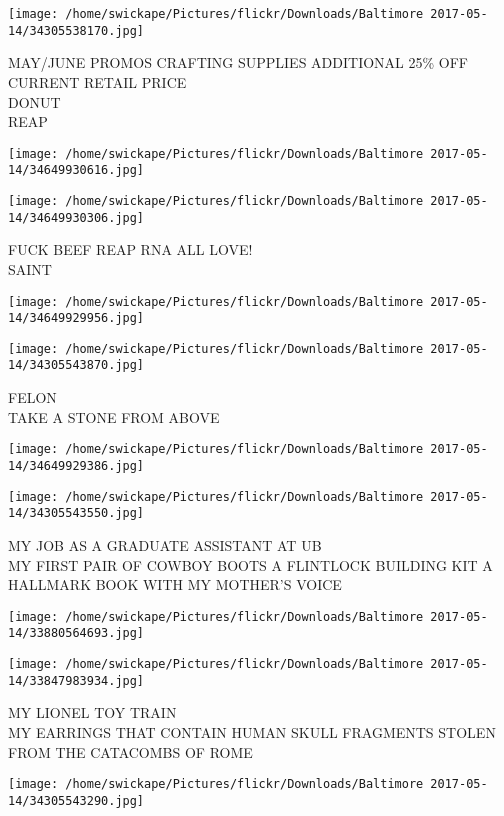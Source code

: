 \documentclass[10pt,letterpaper]{article}
\begin{document}
\vspace{0.25in}
\texttt{[image: /home/swickape/Pictures/flickr/Downloads/Baltimore 2017-05-14/34305538170.jpg]}

MAY/JUNE PROMOS CRAFTING SUPPLIES ADDITIONAL 25\% OFF CURRENT RETAIL PRICE\\
DONUT\\
REAP
\pagebreak

\texttt{[image: /home/swickape/Pictures/flickr/Downloads/Baltimore 2017-05-14/34649930616.jpg]}

\vspace{0.25in}
\texttt{[image: /home/swickape/Pictures/flickr/Downloads/Baltimore 2017-05-14/34649930306.jpg]}

FUCK BEEF REAP RNA ALL LOVE!\\
SAINT
\pagebreak

\texttt{[image: /home/swickape/Pictures/flickr/Downloads/Baltimore 2017-05-14/34649929956.jpg]}

\vspace{0.25in}
\texttt{[image: /home/swickape/Pictures/flickr/Downloads/Baltimore 2017-05-14/34305543870.jpg]}

FELON\\
TAKE A STONE FROM ABOVE
\pagebreak

\texttt{[image: /home/swickape/Pictures/flickr/Downloads/Baltimore 2017-05-14/34649929386.jpg]}

\vspace{0.25in}
\texttt{[image: /home/swickape/Pictures/flickr/Downloads/Baltimore 2017-05-14/34305543550.jpg]}

MY JOB AS A GRADUATE ASSISTANT AT UB\\
MY FIRST PAIR OF COWBOY BOOTS A FLINTLOCK BUILDING KIT A HALLMARK BOOK WITH MY MOTHER'S VOICE
\pagebreak

\texttt{[image: /home/swickape/Pictures/flickr/Downloads/Baltimore 2017-05-14/33880564693.jpg]}

\vspace{0.25in}
\texttt{[image: /home/swickape/Pictures/flickr/Downloads/Baltimore 2017-05-14/33847983934.jpg]}

MY LIONEL TOY TRAIN\\
MY EARRINGS THAT CONTAIN HUMAN SKULL FRAGMENTS STOLEN FROM THE CATACOMBS OF ROME
\pagebreak

\texttt{[image: /home/swickape/Pictures/flickr/Downloads/Baltimore 2017-05-14/34305543290.jpg]}
\end{document}
